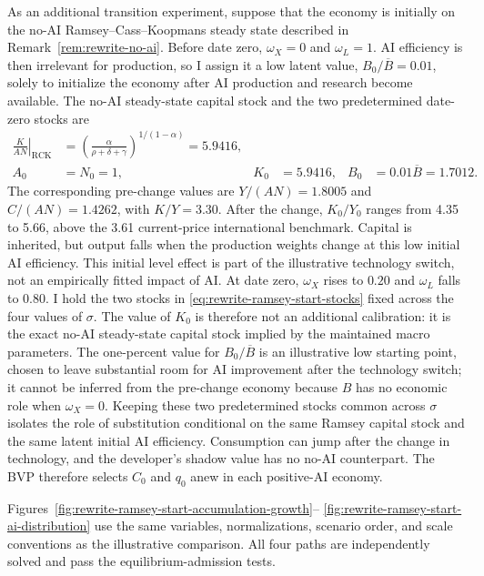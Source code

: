 As an additional transition experiment, suppose that the economy is initially
on the no-AI Ramsey--Cass--Koopmans steady state described in
Remark~\ref{rem:rewrite-no-ai}. Before date zero, $\omega_X=0$ and
$\omega_L=1$. AI efficiency is then irrelevant for production, so I assign it
a low latent value, $B_0/\overline B=0.01$, solely to initialize the economy
after AI production and research become available. The no-AI steady-state
capital stock and the two predetermined date-zero stocks are
\begin{equation}
 \begin{aligned}
 \left.\frac{K}{AN}\right|_{\mathrm{RCK}}
 &=\left(\frac{\alpha}{\rho+\delta+\gamma}\right)^{1/(1-\alpha)}
 =5.9416,\\
 A_0&=N_0=1,
 &K_0&=5.9416,
 &B_0&=0.01\overline B=1.7012.
 \end{aligned}
 \label{eq:rewrite-ramsey-start-stocks}
\end{equation}
The corresponding pre-change values are $Y/(AN)=1.8005$ and
$C/(AN)=1.4262$, with $K/Y=3.30$. After the change, $K_0/Y_0$ ranges from
4.35 to 5.66, above the 3.61 current-price international benchmark. Capital
is inherited, but output falls when the production weights change at this
low initial AI efficiency. This initial level effect is part of the
illustrative technology switch, not an empirically fitted impact of AI.
At date zero, $\omega_X$ rises to $0.20$ and
$\omega_L$ falls to $0.80$. I hold the two stocks in
\eqref{eq:rewrite-ramsey-start-stocks} fixed across the four values of
$\sigma$. The value of $K_0$ is therefore not an additional calibration: it is
the exact no-AI steady-state capital stock implied by the maintained macro
parameters. The one-percent value for $B_0/\overline B$ is an illustrative low
starting point, chosen to leave substantial room for AI improvement after the
technology switch; it cannot be inferred from the pre-change economy because
$B$ has no economic role when $\omega_X=0$. Keeping these two predetermined
stocks common across $\sigma$ isolates the role of substitution conditional on
the same Ramsey capital stock and the same latent initial AI efficiency.
Consumption can jump after the change in technology, and the developer's
shadow value has no no-AI counterpart. The BVP therefore selects
$C_0$ and $q_0$ anew in each positive-AI economy.

Figures~\ref{fig:rewrite-ramsey-start-accumulation-growth}--
\ref{fig:rewrite-ramsey-start-ai-distribution} use the same variables,
normalizations, scenario order, and scale conventions as the illustrative comparison.
All four paths are independently solved and pass the equilibrium-admission
tests.

